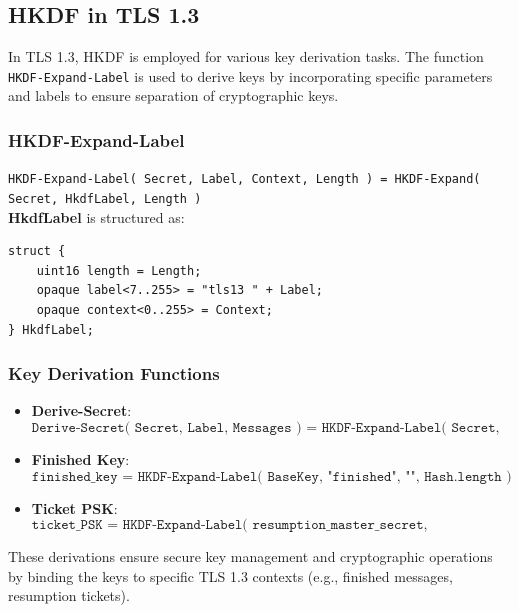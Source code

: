 \subsection{HKDF in TLS 1.3}

In TLS 1.3, HKDF is employed for various key derivation tasks. The function \texttt{HKDF-Expand-Label} is used to derive keys by incorporating specific parameters and labels to ensure separation of cryptographic keys.

\subsubsection{HKDF-Expand-Label}
\texttt{HKDF-Expand-Label( Secret, Label, Context, Length ) = HKDF-Expand( Secret, HkdfLabel, Length )} \\

\textbf{HkdfLabel} is structured as:
\begin{verbatim}
struct {
    uint16 length = Length;
    opaque label<7..255> = "tls13 " + Label;
    opaque context<0..255> = Context;
} HkdfLabel;
\end{verbatim}

\subsubsection{Key Derivation Functions}
\begin{itemize}[itemsep=0pt]
    \item \textbf{Derive-Secret}:
    \[
    \texttt{Derive-Secret( Secret, Label, Messages ) = HKDF-Expand-Label( Secret, Label, Transcript-Hash(Messages), Hash.length )}
    \]
    
    \item \textbf{Finished Key}:
    \[
    \texttt{finished\_key = HKDF-Expand-Label( BaseKey, "finished", "", Hash.length )}
    \]
    
    \item \textbf{Ticket PSK}:
    \[
    \texttt{ticket\_PSK = HKDF-Expand-Label( resumption\_master\_secret, "resumption", ticket\_nonce, Hash.length )}
    \]
\end{itemize}

These derivations ensure secure key management and cryptographic operations by binding the keys to specific TLS 1.3 contexts (e.g., finished messages, resumption tickets).





